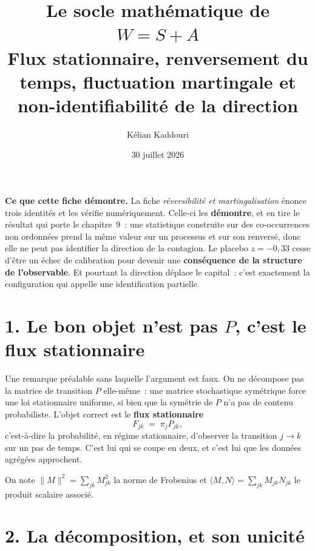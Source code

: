 \documentclass[11pt,a4paper]{article}
\title{\vspace{-1.2cm}\color{navy}\bfseries Le socle mathématique de $W=S+A$\\[2pt]
  \large Flux stationnaire, renversement du temps, fluctuation martingale
  et non-identifiabilité de la direction}
\author{Kélian Kaddouri}
\date{30 juillet 2026}
\theoremstyle{definition}
\begin{document}
\maketitle
\vspace{-0.9cm}

\begin{cle}
\textbf{Ce que cette fiche démontre.} La fiche \emph{réversibilité et martingalisation}
énonce trois identités et les vérifie numériquement. Celle-ci les \textbf{démontre}, et en
tire le résultat qui porte le chapitre~9~: une statistique construite sur des
co-occurrences non ordonnées prend la même valeur sur un processus et sur son renversé,
donc elle ne peut pas identifier la direction de la contagion. Le placebo $z=-0{,}33$
cesse d'être un échec de calibration pour devenir une \textbf{conséquence de la structure
de l'observable}. Et pourtant la direction déplace le capital~: c'est exactement la
configuration qui appelle une identification partielle.
\end{cle}

\section*{1. Le bon objet n'est pas $P$, c'est le flux stationnaire}

Une remarque préalable sans laquelle l'argument est faux. On ne décompose pas la matrice de
transition $P$ elle-même~: une matrice stochastique symétrique force une loi stationnaire
uniforme, si bien que la symétrie de $P$ n'a pas de contenu probabiliste. L'objet correct est
le \textbf{flux stationnaire}
\begin{equation}
  F_{jk} \;=\; \pi_j P_{jk},
  \label{eq:flux}
\end{equation}
c'est-à-dire la probabilité, en régime stationnaire, d'observer la transition $j \to k$
sur un pas de temps. C'est lui qui se coupe en deux, et c'est lui que les données agrégées
approchent.

On note $\|M\|^2=\sum_{jk}M_{jk}^2$ la norme de Frobenius et
$\langle M,N\rangle=\sum_{jk}M_{jk}N_{jk}$ le produit scalaire associé.

\section*{2. La décomposition, et son unicité}
\end{document}
